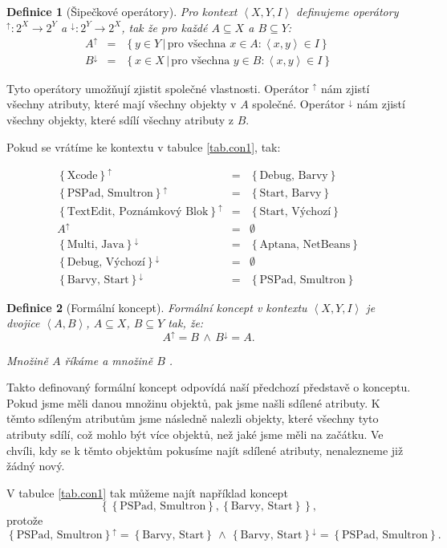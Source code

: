 \documentclass[12pt]{article}
\newcommand{\sep}{\,|\,}
\newcommand{\foreach}{\mbox{pro všechna }}
\newcommand{\adds}[1]{\left\{#1\right\}}
\newcommand{\addsp}[1]{\left<#1\right>}
\newcommand{\logand}{\,\wedge\,}
\newcommand{\context}{\addsp{X, Y, I}}
\newcommand{\AB}{\addsp{A, B}}
\newcommand{\up}{^{\uparrow}}
\newcommand{\down}{^{\downarrow}}
\newtheorem{mydef}{Definice}
\begin{document}
\begin{mydef}[Šipečkové operátory]
Pro kontext $\context$ definujeme operátory $\up:2^X\rightarrow2^Y$ a $\down:2^Y\rightarrow2^X$, tak že pro každé $A\subseteq X$ a $B\subseteq Y$:
\begin{eqnarray}
A\up&=&\adds{y\in Y\sep \foreach x \in A: \addsp{x, y}\in I}\\
B\down&=&\adds{x\in X\sep\foreach y\in B:\addsp{x, y} \in I}
\end{eqnarray}
\end{mydef}

Tyto operátory umožňují zjistit společné vlastnosti. Operátor $\up$ nám zjistí všechny atributy, které mají všechny objekty v $A$ společné. Operátor $\down$ nám zjistí všechny objekty, které sdílí všechny atributy z $B$. 

Pokud se vrátíme ke kontextu v tabulce \ref{tab.con1}, tak:

\begin{eqnarray*}
\adds{\mbox{Xcode}}\up&=&\adds{\mbox{Debug, Barvy}}\\
\adds{\mbox{PSPad, Smultron}}\up&=&\adds{\mbox{Start, Barvy}}\\
\adds{\mbox{TextEdit, Poznámkový Blok}}\up&=&\adds{\mbox{Start, Výchozí}}\\
A\up&=&\emptyset\\
\adds{\mbox{Multi, Java}}\down&=&\adds{\mbox{Aptana, NetBeans}}\\
\adds{\mbox{Debug, Výchozí}}\down&=&\emptyset\\
\adds{\mbox{Barvy, Start}}\down&=&\adds{\mbox{PSPad, Smultron}}
\end{eqnarray*}

\begin{mydef}[Formální koncept]
Formální koncept v kontextu $\context$ je dvojice $\AB$, $A\subseteq X$, $B\subseteq Y$ tak, že:
$$A\up=B\logand B\down =A.$$

Množině $A$ říkáme  a množině $B$ .
\end{mydef}

Takto definovaný formální koncept odpovídá naší předchozí představě o konceptu. Pokud jsme měli danou množinu objektů, pak jsme našli sdílené atributy. K těmto sdíleným atributům jsme následně nalezli objekty, které všechny tyto atributy sdílí, což mohlo být více objektů, než jaké jsme měli na začátku. Ve chvíli, kdy se k těmto objektům pokusíme najít sdílené atributy, nenalezneme již žádný nový.

V tabulce \ref{tab.con1} tak můžeme najít například koncept 
$$\adds{\adds{\mbox{PSPad, Smultron}}, \adds{\mbox{Barvy, Start}}},$$ 
protože 
$$\adds{\mbox{PSPad, Smultron}}\up=\adds{\mbox{Barvy, Start}} \logand \adds{\mbox{Barvy, Start}}\down=\adds{\mbox{PSPad, Smultron}}.$$
\end{document}
